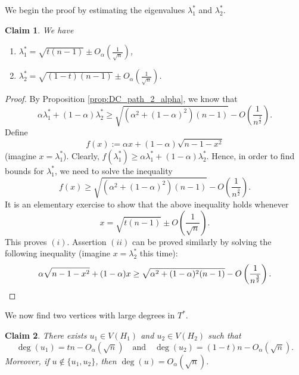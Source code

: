 \documentclass[11pt]{article}
\theoremstyle{plain}
\newtheorem{claim}{Claim}[section]
\numberwithin{equation}{section}
\begin{document}
We begin the proof by estimating the eigenvalues $\lambda_1^*$ and $\lambda_2^*$.

\begin{claim}\label{claim:lambda_1_2_estimates}
We have 
    \begin{enumerate}[$(i)$]
        \item $\lambda_1^* = \sqrt{t(n-1)} \pm O_\alpha\left(\frac{1}{\sqrt{n}}\right)$,
        \item $\lambda_2^* = \sqrt{(1-t)(n-1)} \pm O_\alpha\left(\frac{1}{\sqrt{n}}\right)$.
    \end{enumerate}
\end{claim}

\begin{proof}
By Proposition \ref{prop:DC_path_2_alpha}, we know that 
\[ \alpha \lambda_1^* + (1-\alpha)\lambda_2^* \ge \sqrt{(\alpha^2 + (1-\alpha)^2)(n-1)} - O\left(\frac{1}{n^{\frac{3}{2}}}\right).\]
Define 
\[f(x) := \alpha x + (1-\alpha)\sqrt{n-1 - x^2}\] 
(imagine $x = \lambda_1^*$). Clearly, $f(\lambda_1^*) \ge \alpha \lambda_1^* + (1-\alpha)\lambda_2^*.$ Hence, in order to find bounds for $\lambda_1^*$, we need to solve the inequality 
\[ f(x) \ge \sqrt{(\alpha^2 + (1-\alpha)^2)(n-1)} - O\left(\frac{1}{n^{\frac{3}{2}}}\right).\]
It is an elementary exercise to show that the above inequality holds whenever 
\[ x = \sqrt{t(n-1)} \pm O\left(\frac{1}{\sqrt{n}}\right).\]
This proves $(i)$. Assertion $(ii)$ can be proved similarly by solving the following inequality (imagine $x = \lambda_2^*$ this time):
\[ \alpha \sqrt{n-1-x^2} + (1-\alpha)x \ge \sqrt{\alpha^2 + (1-\alpha)^2(n-1)} - O\left(\frac{1}{n^{\frac{3}{2}}}\right). \qedhere\]\end{proof}

We now find two vertices with large degrees in $T^*$.

\begin{claim}\label{claim:u_1_u_2_degree_sqrtn}
    There exists $u_1\in V(H_1)$ and $u_2\in V(H_2)$ such that 
    \[\deg(u_1) = tn - O_\alpha(\sqrt{n}) \quad\text{and}\quad \deg(u_2) = (1-t)n - O_\alpha(\sqrt{n}).\]
    Moreover, if $u\notin \{u_1, u_2\}$, then $\deg(u) = O_\alpha(\sqrt{n})$.
\end{claim}
\end{document}
